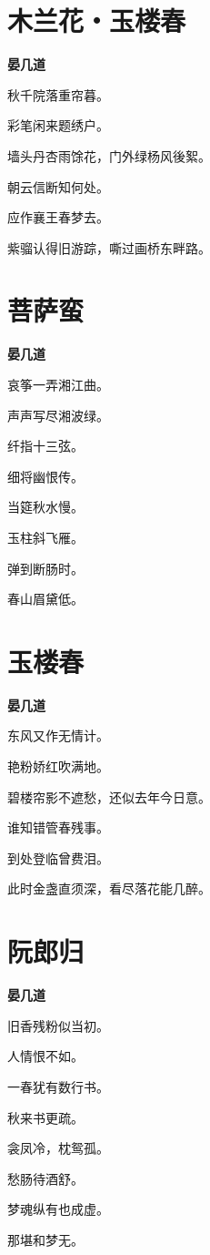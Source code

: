 \documentclass[12pt,a4paper]{ctexbook}
\begin{document}
\section{木兰花・玉楼春}
\textbf{晏几道}\par\vspace{0.5em}
秋千院落重帘暮。\par
彩笔闲来题绣户。\par
墙头丹杏雨馀花，门外绿杨风後絮。\par
朝云信断知何处。\par
应作襄王春梦去。\par
紫骝认得旧游踪，嘶过画桥东畔路。\par

\section{菩萨蛮}
\textbf{晏几道}\par\vspace{0.5em}
哀筝一弄湘江曲。\par
声声写尽湘波绿。\par
纤指十三弦。\par
细将幽恨传。\par
当筵秋水慢。\par
玉柱斜飞雁。\par
弹到断肠时。\par
春山眉黛低。\par

\section{玉楼春}
\textbf{晏几道}\par\vspace{0.5em}
东风又作无情计。\par
艳粉娇红吹满地。\par
碧楼帘影不遮愁，还似去年今日意。\par
谁知错管春残事。\par
到处登临曾费泪。\par
此时金盏直须深，看尽落花能几醉。\par

\section{阮郎归}
\textbf{晏几道}\par\vspace{0.5em}
旧香残粉似当初。\par
人情恨不如。\par
一春犹有数行书。\par
秋来书更疏。\par
衾凤冷，枕鸳孤。\par
愁肠待酒舒。\par
梦魂纵有也成虚。\par
那堪和梦无。\par
\end{document}

